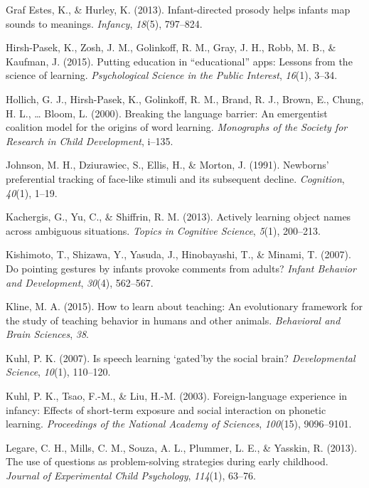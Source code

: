 \documentclass[a4paper,man,apacite,floatsintext]{apa6}
\begin{document}
\hypertarget{ref-graf2013infant}{}
Graf Estes, K., \& Hurley, K. (2013). Infant-directed prosody helps
infants map sounds to meanings. \emph{Infancy}, \emph{18}(5), 797--824.

\hypertarget{ref-hirsh2015putting}{}
Hirsh-Pasek, K., Zosh, J. M., Golinkoff, R. M., Gray, J. H., Robb, M.
B., \& Kaufman, J. (2015). Putting education in ``educational'' apps:
Lessons from the science of learning. \emph{Psychological Science in the
Public Interest}, \emph{16}(1), 3--34.

\hypertarget{ref-hollich2000breaking}{}
Hollich, G. J., Hirsh-Pasek, K., Golinkoff, R. M., Brand, R. J., Brown,
E., Chung, H. L., \ldots{} Bloom, L. (2000). Breaking the language
barrier: An emergentist coalition model for the origins of word
learning. \emph{Monographs of the Society for Research in Child
Development}, i--135.

\hypertarget{ref-johnson1991newborns}{}
Johnson, M. H., Dziurawiec, S., Ellis, H., \& Morton, J. (1991).
Newborns' preferential tracking of face-like stimuli and its subsequent
decline. \emph{Cognition}, \emph{40}(1), 1--19.

\hypertarget{ref-kachergis2013actively}{}
Kachergis, G., Yu, C., \& Shiffrin, R. M. (2013). Actively learning
object names across ambiguous situations. \emph{Topics in Cognitive
Science}, \emph{5}(1), 200--213.

\hypertarget{ref-kishimoto2007pointing}{}
Kishimoto, T., Shizawa, Y., Yasuda, J., Hinobayashi, T., \& Minami, T.
(2007). Do pointing gestures by infants provoke comments from adults?
\emph{Infant Behavior and Development}, \emph{30}(4), 562--567.

\hypertarget{ref-kline2015learn}{}
Kline, M. A. (2015). How to learn about teaching: An evolutionary
framework for the study of teaching behavior in humans and other
animals. \emph{Behavioral and Brain Sciences}, \emph{38}.

\hypertarget{ref-kuhl2007speech}{}
Kuhl, P. K. (2007). Is speech learning `gated'by the social brain?
\emph{Developmental Science}, \emph{10}(1), 110--120.

\hypertarget{ref-kuhl2003foreign}{}
Kuhl, P. K., Tsao, F.-M., \& Liu, H.-M. (2003). Foreign-language
experience in infancy: Effects of short-term exposure and social
interaction on phonetic learning. \emph{Proceedings of the National
Academy of Sciences}, \emph{100}(15), 9096--9101.

\hypertarget{ref-legare2013use}{}
Legare, C. H., Mills, C. M., Souza, A. L., Plummer, L. E., \& Yasskin,
R. (2013). The use of questions as problem-solving strategies during
early childhood. \emph{Journal of Experimental Child Psychology},
\emph{114}(1), 63--76.
\end{document}
